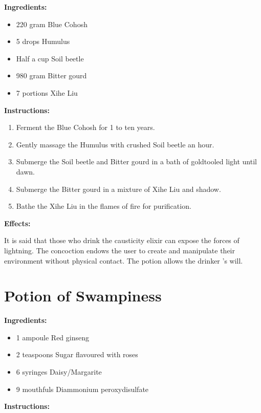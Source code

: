 \documentclass{article}
\begin{document}
\textbf{Ingredients:}

\begin{itemize}
  \item 220 gram Blue Cohosh
  \item 5 drops Humulus
  \item Half a cup Soil beetle
  \item 980 gram Bitter gourd
  \item 7 portions Xihe Liu
\end{itemize}

\textbf{Instructions:}

\begin{enumerate}
  \item Ferment the Blue Cohosh for 1 to ten years.
  \item Gently massage the Humulus with crushed Soil beetle an hour.
  \item Submerge the Soil beetle and Bitter gourd in a bath of goldtooled light until dawn.
  \item Submerge the Bitter gourd in a mixture of Xihe Liu and shadow.
  \item Bathe the Xihe Liu in the flames of fire for purification.
\end{enumerate}

\textbf{Effects:}

It is said that those who drink the causticity elixir can expose the forces of lightning. The concoction endows the user to create and manipulate their environment without physical contact. The potion allows the drinker 's will.

\newpage
\section*{Potion of Swampiness}

\textbf{Ingredients:}

\begin{itemize}
  \item 1 ampoule Red ginseng
  \item 2 teaspoons Sugar flavoured with roses
  \item 6 syringes Daisy/Margarite
  \item 9 mouthfuls Diammonium peroxydisulfate
\end{itemize}

\textbf{Instructions:}
\end{document}

